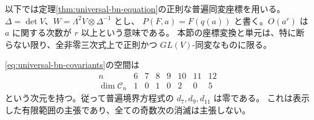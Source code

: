 以下では定理\ref{thm:universal-bn-equation}の正則な普遍同変座標を用いる。
$\Delta=\det V$、$W=\Lambda^2V\otimes\Delta^{-1}$ とし、
$P(F,a)=F(q(a))$ と書く。$O(a^r)$ は $a$ に関する次数が $r$ 以上という意味である。
本節の座標変換と単元は、特に断らない限り、全非零三次式上で正則かつ
$GL(V)$-同変なものに限る。

\begin{lemma}[境界共変量の有限次元計算]\label{lem:boundary-covariant-dimensions}
\eqref{eq:universal-bn-covariants}の空間は
\[
\begin{array}{c|rrrrrrr}
 n&6&7&8&9&10&11&12\\ \hline
 \dim\mathcal C_n&1&0&1&0&2&0&5
\end{array}
\]
という次元を持つ。従って普遍境界方程式の $d_7,d_9,d_{11}$ は零である。
これは表示した有限範囲の主張であり、全ての奇数次の消滅は主張しない。
\end{lemma}

